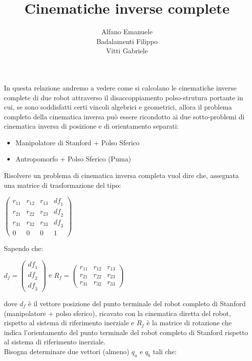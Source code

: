 \documentclass[a4paper,12pt]{article}
\author{Alfano Emanuele \\ Badalamenti Filippo \\ Vitti Gabriele}
\begin{document}
\title{Cinematiche inverse complete}
\maketitle

In questa relazione andremo a vedere come si calcolano le cinematiche
  inverse complete di due robot attraverso il disaccoppiamento polso-strutura portante in cui, se sono soddisfatti certi vincoli algebrici e geometrici, allora il problema completo della cinematica inversa può essere ricondotto ai due sotto-problemi di cinematica inversa di posizione e di orientamento separati:

\begin{itemize}
\item Manipolatore di Stanford + Polso Sferico
\item Antropomorfo + Polso Sferico (Puma)
\end{itemize}

Risolvere un problema di cinematica inversa completa vuol dire che, assegnata una matrice di trasformazione del tipo:

\begin{center}
$\begin{pmatrix}
{r_{11}} & {r_{12}} & {r_{13}} & {{\mathit{df}}_1}\\
{r_{21}} & {r_{22}} & {r_{23}}&{{\mathit{df}}_2}\\
{r_{31}} & {r_{32}} & {r_{33}} & {{\mathit{df}}_3}\\
0 & 0 & 0 & 1
\end{pmatrix}$
\end{center}

Sapendo che:

\begin{center}
$d_f=\begin{pmatrix}{{\mathit{df}}_1}\\
{{\mathit{df}}_2}\\
{{\mathit{df}}_3}\end{pmatrix}$ e $R_f=\begin{pmatrix}{r_{11}} & {r_{12}} & {r_{13}}\\
{r_{21}} & {r_{22}} & {r_{23}}\\
{r_{31}} & {r_{32}} & {r_{33}}\end{pmatrix}$
\end{center}

dove $d_f$ è il vettore posizione del punto terminale del robot completo di Stanford (manipolatore + polso sferico), ricavato con la cinematica diretta del robot, rispetto al sistema di riferimento inerziale e $R_f$ è la matrice di rotazione che indica l'orientamento del punto terminale del robot completo di Stanford rispetto al sistema di riferimento inerziale.\\
 Bisogna determinare due vettori (almeno) $q_a$ e $q_b$ tali che: \\
\end{document}
